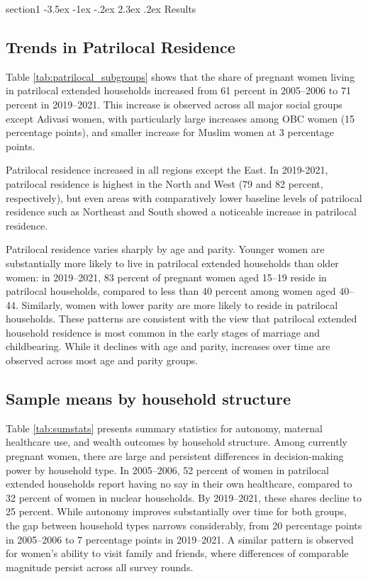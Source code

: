 \documentclass[12pt]{article}
\makeatletter
\renewcommand\section{\@startsection
{section}{1}{\z@}
{-3.5ex \@plus -1ex \@minus -.2ex}
{2.3ex \@plus.2ex}
{\centering\normalfont\Large\bfseries}}
\makeatother
\begin{document}
\newpage
\section{Results}
\subsection{Trends in Patrilocal Residence}

Table \ref{tab:patrilocal_subgroups} shows that the share of pregnant women living in patrilocal extended households increased from 61 percent in 2005–2006 to 71 percent in 2019–2021. This increase is observed across all major social groups except Adivasi women, with particularly large increases among OBC women (15 percentage points), and smaller increase for Muslim women at 3 percentage points.

Patrilocal residence increased in all regions except the East. In 2019-2021, patrilocal residence is highest in the North and West (79 and 82 percent, respectively), but even areas with comparatively lower baseline levels of patrilocal residence such as Northeast and South showed a noticeable increase in patrilocal residence.  

Patrilocal residence varies sharply by age and parity. Younger women are substantially more likely to live in patrilocal extended households than older women: in 2019–2021, 83 percent of pregnant women aged 15–19 reside in patrilocal households, compared to less than 40 percent among women aged 40–44. Similarly, women with lower parity are more likely to reside in patrilocal households. These patterns are consistent with the view that patrilocal extended household residence is most common in the early stages of marriage and childbearing. While it declines with age and parity, increases over time are observed across most age and parity groups. 

\subsection{Sample means by household structure}

Table \ref{tab:sumstats} presents summary statistics for autonomy, maternal healthcare use, and wealth outcomes by household structure. Among currently pregnant women, there are large and persistent differences in decision-making power by household type. In 2005–2006, 52 percent of women in patrilocal extended households report having no say in their own healthcare, compared to 32 percent of women in nuclear households. By 2019–2021, these shares decline to 25 percent. While autonomy improves substantially over time for both groups, the gap between household types narrows considerably, from 20 percentage points in 2005–2006 to 7 percentage points in 2019–2021. A similar pattern is observed for women’s ability to visit family and friends, where differences of comparable magnitude persist across all survey rounds.
\end{document}
